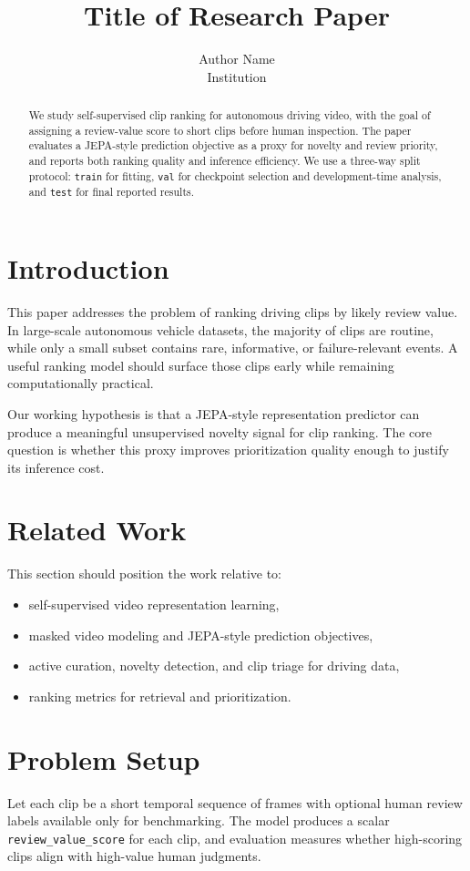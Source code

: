 \documentclass[10pt,twocolumn,letterpaper]{article}
\title{Title of Research Paper}
\author{Author Name\\Institution}
\date{}
\begin{document}
\maketitle

\begin{abstract}
We study self-supervised clip ranking for autonomous driving video, with the goal of assigning a review-value score to short clips before human inspection. The paper evaluates a JEPA-style prediction objective as a proxy for novelty and review priority, and reports both ranking quality and inference efficiency. We use a three-way split protocol: \texttt{train} for fitting, \texttt{val} for checkpoint selection and development-time analysis, and \texttt{test} for final reported results.
\end{abstract}

\section{Introduction}
This paper addresses the problem of ranking driving clips by likely review value. In large-scale autonomous vehicle datasets, the majority of clips are routine, while only a small subset contains rare, informative, or failure-relevant events. A useful ranking model should surface those clips early while remaining computationally practical.

Our working hypothesis is that a JEPA-style representation predictor can produce a meaningful unsupervised novelty signal for clip ranking. The core question is whether this proxy improves prioritization quality enough to justify its inference cost.

\section{Related Work}
This section should position the work relative to:
\begin{itemize}
    \item self-supervised video representation learning,
    \item masked video modeling and JEPA-style prediction objectives,
    \item active curation, novelty detection, and clip triage for driving data,
    \item ranking metrics for retrieval and prioritization.
\end{itemize}

\section{Problem Setup}
Let each clip be a short temporal sequence of frames with optional human review labels available only for benchmarking. The model produces a scalar \texttt{review\_value\_score} for each clip, and evaluation measures whether high-scoring clips align with high-value human judgments.
\end{document}
